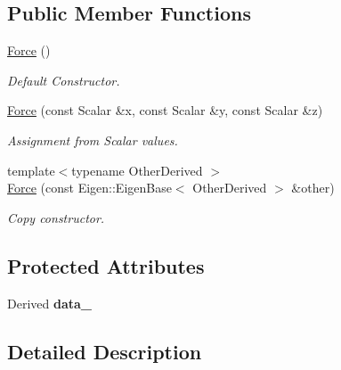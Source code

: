 \subsection*{Public Member Functions}
\begin{DoxyCompactItemize}
\item 
\hyperlink{classow__core_1_1Force_ab6ef4b86db1e7e9a6f87ec6f71eb6d70}{Force} ()\hypertarget{classow__core_1_1Force_ab6ef4b86db1e7e9a6f87ec6f71eb6d70}{}\label{classow__core_1_1Force_ab6ef4b86db1e7e9a6f87ec6f71eb6d70}

\begin{DoxyCompactList}\small\item\em Default Constructor. \end{DoxyCompactList}\item 
\hyperlink{classow__core_1_1Force_a59f02d31c749b20c4d8f9a75c12648bd}{Force} (const Scalar \&x, const Scalar \&y, const Scalar \&z)\hypertarget{classow__core_1_1Force_a59f02d31c749b20c4d8f9a75c12648bd}{}\label{classow__core_1_1Force_a59f02d31c749b20c4d8f9a75c12648bd}

\begin{DoxyCompactList}\small\item\em Assignment from Scalar values. \end{DoxyCompactList}\item 
{\footnotesize template$<$typename Other\+Derived $>$ }\\\hyperlink{classow__core_1_1Force_a18c51f9e8b1fa8dbeada59438110aa97}{Force} (const Eigen\+::\+Eigen\+Base$<$ Other\+Derived $>$ \&other)
\begin{DoxyCompactList}\small\item\em Copy constructor. \end{DoxyCompactList}\end{DoxyCompactItemize}
\subsection*{Protected Attributes}
\begin{DoxyCompactItemize}
\item 
Derived {\bfseries data\+\_\+}\hypertarget{classow__core_1_1Force_af945fade7b7a37dfb0c86406b5794e7e}{}\label{classow__core_1_1Force_af945fade7b7a37dfb0c86406b5794e7e}

\end{DoxyCompactItemize}


\subsection{Detailed Description}
